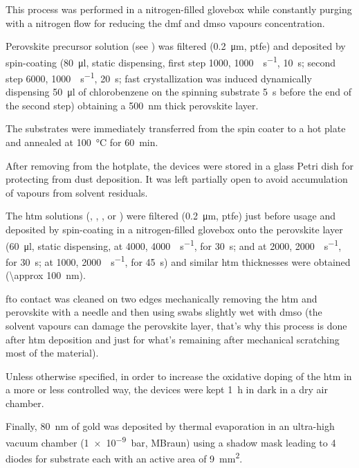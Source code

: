 			This process was performed in a nitrogen-filled glovebox
			while constantly purging with a nitrogen flow for reducing the \gls{dmf} and \gls{dmso} vapours concentration.

			Perovskite precursor solution (see ) was filtered (\SI{0.2}{\um}, \gls{ptfe})
			and deposited by spin-coating (\SI{80}{\ul}, static dispensing, first step \SI{1000}{\rpm}, \SI{1000}{\rpm\per\s}, \SI{10}{\s};
			second step \SI{6000}{\rpm}, \SI{1000}{\rpm\per\s}, \SI{20}{\s}; fast crystallization was induced dynamically
			dispensing \SI{50}{\ul} of chlorobenzene on the spinning substrate \SI{5}{\s} before the end of the second
			step) obtaining a \SI{500}{\nm} thick perovskite layer.

			The substrates were immediately transferred from
			the spin coater to a hot plate and annealed at \SI{100}{\celsius} for \SI{60}{\minute}.

			After removing from the hotplate, the devices were stored in a glass Petri dish for protecting from dust deposition. It was left partially open to avoid accumulation of vapours from solvent residuals.


			The \gls{htm} solutions (\spiro, , , or ) were filtered (\SI{0.2}{\um}, \gls{ptfe}) just before usage and deposited by spin-coating in a nitrogen-filled glovebox
			onto the perovskite layer (\SI{60}{\ul}, static dispensing, \spiro at \SI{4000}{\rpm}, \SI{4000}{\rpm\per\s},
			for \SI{30}{\s};  and  at \SI{2000}{\rpm}, \SI{2000}{\rpm\per\s}, for \SI{30}{\s};  at \SI{1000}{\rpm}, \SI{2000}{\rpm\per\s},
			for \SI{45}{\s}) and similar \gls{htm} thicknesses were obtained (\SI{\approx 100}{\nm}).

			\Gls{fto} contact was cleaned on two edges mechanically removing the \gls{htm} and perovskite with a needle and then using swabs slightly wet with \gls{dmso} (the solvent vapours can damage the perovskite layer, that's why this process is done after \gls{htm} deposition and just for what's remaining after mechanical scratching most of the material).

			Unless otherwise specified, in order to increase the
			oxidative doping of the \gls{htm} in a more or less controlled way, the devices were kept \SI{1}{\hour} in dark in a dry air chamber.

			Finally, \SI{80}{\nm} of gold was deposited by thermal evaporation in an ultra-high vacuum chamber
			(\SI{1e-9}{\bar}, MBraun) using a shadow mask leading to 4 diodes for substrate each with an active area of
			\SI{9}{\mm\squared}.

